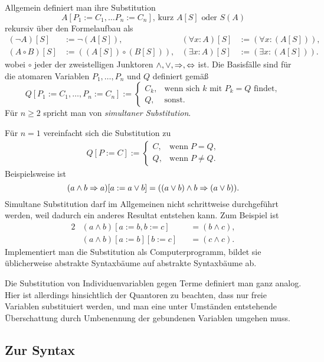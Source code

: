 Allgemein definiert man ihre Substitution
\[A[P_1:=C_1,\ldots P_n:=C_n],\,\text{kurz $A[S]$ oder $S(A)$}\]
rekursiv über den Formelaufbau als
\begin{align*}
(\lnot A)[S] &:= \lnot (A[S]), & (\forall x\colon A)[S] &:= (\forall x\colon (A[S])),\\
(A\circ B)[S] &:= ((A[S])\circ (B[S])), & (\exists x\colon A)[S] &:= (\exists x\colon (A[S])).
\end{align*}
wobei $\circ$ jeder der zweistelligen Junktoren
$\land,\lor,\Rightarrow,\Leftrightarrow$ ist. Die Basisfälle sind für die atomaren
Variablen $P_1,\ldots, P_n$ und $Q$ definiert gemäß
\[Q[P_1:=C_1, \ldots, P_n:=C_n] := \begin{cases}
C_k, & \text{wenn sich $k$ mit $P_k=Q$ findet},\\
Q, & \text{sonst}.
\end{cases}\]
Für $n\ge 2$ spricht man von \emph{simultaner Substitution}.

Für $n=1$ vereinfacht sich die Substitution zu
\begin{align*}
Q[P:=C] := \begin{cases}
C, & \text{wenn}\;P=Q,\\
Q, & \text{wenn}\;P\ne Q.
\end{cases}
\end{align*}
Beispielsweise ist
\[(a\land b\Rightarrow a)[a:=a\lor b] = ((a\lor b)\land b\Rightarrow (a\lor b)).\]
Simultane Substitution darf im Allgemeinen nicht schrittweise
durchgeführt werden, weil dadurch ein anderes Resultat entstehen kann.
Zum Beispiel ist
\begin{alignat*}{2}
& (a\land b)[a:=b,b:=c] &&= (b\land c),\\
& (a\land b)[a:=b][b:=c] &&= (c\land c).
\end{alignat*}
Implementiert man die Substitution als Computerprogramm, bildet sie
üblicherweise abstrakte Syntaxbäume auf abstrakte Syntaxbäume ab.

Die Substitution von Individuenvariablen gegen Terme definiert man
ganz analog. Hier ist allerdings hinsichtlich der Quantoren zu beachten,
dass nur freie Variablen substituiert werden, und man eine unter
Umständen entstehende Überschattung durch Umbenennung der gebundenen
Variablen umgehen muss.

\subsection{Zur Syntax}

